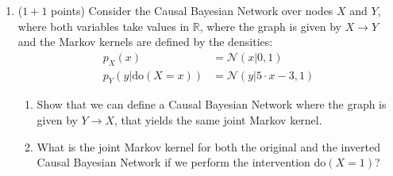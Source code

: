 \begin{enumerate}
\begin{gradedsolution}
  We have
  \begin{align*}
    \mat{X \\ Y} \sim \mathcal{N}\left( \mat{\mu_1\\ a\cdot\mu_1 + \mu_2}, \Sigma\right) \quad \text{with} \quad \Sigma := \mat{\sigma_1^2 & a\sigma_1^2 \\ a \sigma_1^2 & a^2 \sigma_1^2 + \sigma_2^2}
  \end{align*}
  and
  \begin{align*}
    P(Z|\doit(X=x), \doit(Y=y)) &= \mathcal{N}\left(A\mat{x\\y} + \mu_3, \sigma^2_3\right)
  \end{align*}
  where $A = \mat{c, b}$, and so
  \begin{align*}
    \mat{X \\ Y \\ Z} \sim \mathcal{N}\left(\mat{\mu_1\\ a\mu_1+\mu_2 \\ b(a\mu_1 + \mu_2) + c\mu_1 + \mu_3}, \mat{\Sigma & \Sigma A^\top \\ A\Sigma & \sigma_3^2 + A\Sigma A^\top}\right), 
  \end{align*}
  Then we see that $\textrm{Cov}(X, Z) = (A\Sigma)_1 = (ab+c)\sigma_1^2 = 0$ whenever $ab+c=0$, so for these parameters we have $X\Indep Z$. Since $X$ is not d-separated from $Z$ in $G$, this is a faithfulness violation.
\end{gradedsolution}

\item ($1 + 1$ points) Consider the Causal Bayesian Network over nodes $X$ and $Y$, where both variables take values in $\mathbb{R}$, where the graph is given by $X \rightarrow Y$ and the Markov kernels are defined by the densities:
\begin{align*}
  p_X(x) &= \mathcal{N}(x|0,1) \\
  p_Y(y|\text{do}(X=x)) &= \mathcal{N}(y|5\cdot x -3, 1)
\end{align*}
\begin{enumerate}
  \item Show that we can define a Causal Bayesian Network where the graph is given by $Y \rightarrow X$, that yields the same joint Markov kernel.
  \item What is the joint Markov kernel for both the original and the inverted Causal Bayesian Network if we perform the intervention do$(X=1)$?
\end{enumerate}


\end{enumerate}
